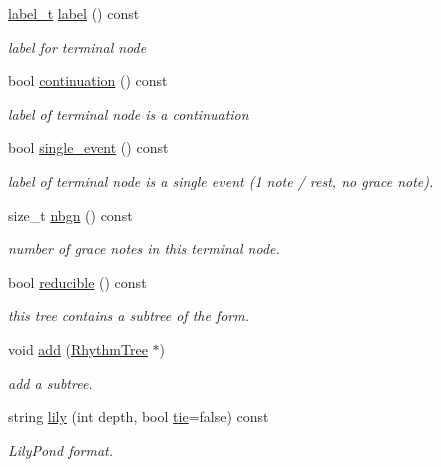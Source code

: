 \begin{DoxyCompactItemize}
\mbox{\hyperlink{group__output_ga22fde970e635fcf63962743b2d5c441d}{label\+\_\+t}} \mbox{\hyperlink{group__output_ga40e2aa462ed42fa46d3beafca9dbc350}{label}} () const
\begin{DoxyCompactList}\small\item\em label for terminal node \end{DoxyCompactList}\item 
bool \mbox{\hyperlink{group__output_ga1ca015dec36fa32ff6d66aaad10f4eb0}{continuation}} () const
\begin{DoxyCompactList}\small\item\em label of terminal node is a continuation \end{DoxyCompactList}\item 
bool \mbox{\hyperlink{group__output_gabd793b78f71fb62edb13497e0a13f48c}{single\+\_\+event}} () const
\begin{DoxyCompactList}\small\item\em label of terminal node is a single event (1 note / rest, no grace note). \end{DoxyCompactList}\item 
size\+\_\+t \mbox{\hyperlink{group__output_gaaaf06fe2227a6598b109a72d89afa8d7}{nbgn}} () const
\begin{DoxyCompactList}\small\item\em number of grace notes in this terminal node. \end{DoxyCompactList}\item 
bool \mbox{\hyperlink{group__output_gafdda5b1a3c16c8e64337c26bcdb368e9}{reducible}} () const
\begin{DoxyCompactList}\small\item\em this tree contains a subtree of the form. \end{DoxyCompactList}\item 
void \mbox{\hyperlink{group__output_ga5749469b3ff6ec88fcab75961e7d278c}{add}} (\mbox{\hyperlink{classRhythmTree}{Rhythm\+Tree}} $\ast$)
\begin{DoxyCompactList}\small\item\em add a subtree. \end{DoxyCompactList}\item 
string \mbox{\hyperlink{group__output_gafcd0d23d1cdb8cd92fbaec2fac51d259}{lily}} (int depth, bool \mbox{\hyperlink{group__output_ga3933e83072d4e7c3bb3d19d25df90b47}{tie}}=false) const
\begin{DoxyCompactList}\small\item\em Lily\+Pond format. \end{DoxyCompactList}\item 

\end{DoxyCompactItemize}
